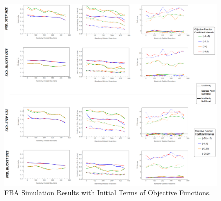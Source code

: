 \begin{landscape}
	\begin{figure}[ht]
		\centering
		\includegraphics[width=1.1\textwidth]{../images/results-obj_func_terms_initial-simulation-results.png}
		\caption{FBA Simulation Results with Initial Terms of Objective Functions.}
		\label{figure-supplements-obj_func-terms-initial}
	\end{figure}
\end{landscape}